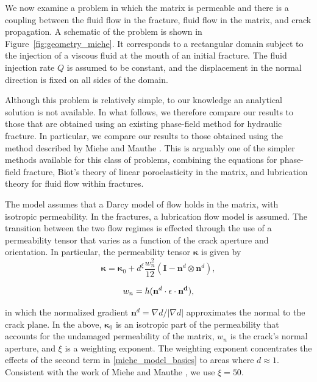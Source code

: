 We now examine a problem in which the matrix is permeable and there is a coupling between the fluid flow in the fracture, fluid flow in the matrix, and crack propagation.  A schematic of the problem is shown in Figure~\ref{fig:geometry_miehe}.   It corresponds to a rectangular domain subject to the injection of a viscous fluid at the mouth of an initial fracture.  The fluid injection rate $Q$ is assumed to be constant, and the displacement in the normal direction is fixed on all sides of the domain.  

Although this problem is relatively simple, to our knowledge an analytical solution is not available.  In what follows, we therefore compare our results to those that are obtained using an existing phase-field method for hydraulic fracture.  In particular, we compare our results to those obtained using the method described by Miehe and Mauthe \cite{miehe2015minimization, miehe2016phase}.  This is arguably one of the simpler methods available for this class of problems, combining the equations for phase-field fracture, Biot's theory of linear poroelasticity in the matrix, and lubrication theory for fluid flow within fractures.

The model assumes that a Darcy model of flow holds in the matrix, with isotropic permeability.  In the fractures, a lubrication flow model is assumed.  The transition between the two flow regimes is effected through the use of a permeability tensor that varies as a function of the crack aperture and orientation.  In particular, the permeability tensor ${\boldsymbol{\kappa}}$ is given by
\begin{equation}\label{miehe_model_basics}
    \boldsymbol{\kappa} = \boldsymbol{\kappa}_0 + d^\xi\dfrac{w^2_n}{12}\left(\textbf{I} - \textbf{n}^d \otimes \textbf{n}^d \right),
\end{equation}

\begin{equation}\label{miehe_model_aperture}
    w_n = h (\textbf{n}^d \cdot \bf{\epsilon} \cdot \textbf{n}^d),
\end{equation}

in which the normalized gradient $\textbf{n}^d = \nabla d/|\nabla d|$ approximates the normal to the crack plane.   In the above, $\boldsymbol{\kappa}_0$ is an isotropic part of the permeability that accounts for the undamaged permeability of the matrix, $w_n$ is the crack's normal aperture, and $\xi$ is a weighting exponent.  The weighting exponent concentrates the effects of the second term in \ref{miehe_model_basics} to areas where $d \approx 1$. Consistent with the work of Miehe and Mauthe \cite{miehe2015minimization, miehe2016phase}, we use $\xi= 50$.

